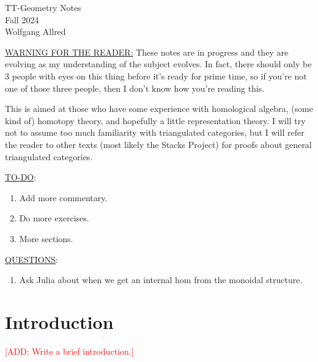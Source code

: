 \documentclass[11pt]{article}
\begin{document}
\begin{centering}
\Large{TT-Geometry Notes}\\

\normalsize{Fall 2024 \\ Wolfgang Allred}

\end{centering}
\bigskip

\noindent

\large{\underline{WARNING FOR THE READER:}} \normalsize These notes are in progress and they are evolving as my understanding of the subject evolves. In fact, there should only be 3 people with eyes on this thing before it's ready for prime time, so if you're not one of those three people, then I don't know how you're reading this.

This is aimed at those who have some experience with homological algebra, (some kind of) homotopy theory, and hopefully a little representation theory. I will try not to assume too much familiarity with triangulated categories, but I will refer the reader to other texts (most likely the Stacks Project) for proofs about general triangulated categories.

\large{\underline{TO-DO}:}\normalsize
\begin{enumerate}[$\bullet$]
	\item Add more commentary.
	\item Do more exercises.
	\item More sections.
\end{enumerate}


\large{\underline{QUESTIONS}:}\normalsize
\begin{enumerate}[$\bullet$]
	\item Ask Julia about when we get an internal hom from the monoidal structure.
\end{enumerate}

\newpage
\tableofcontents

\section{Introduction}

\large{\textcolor{red}{[ADD: Write a brief introduction.]}} \normalsize
\end{document}
